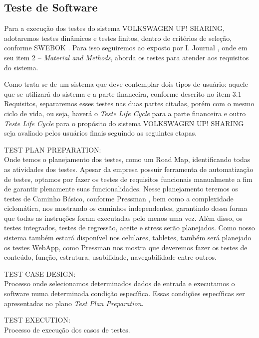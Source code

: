 \documentclass[12pt]{article}
\begin{document}
\subsection{Teste de Software}

Para a execução dos testes  do sistema VOLKSWAGEN UP! SHARING, adotaremos testes dinâmicos  e testes finitos, dentro de critérios de seleção, conforme SWEBOK \cite{Swebok}. Para isso seguiremos ao exposto por I. Journal \cite{Journal2013}, onde em seu item 2 – \textit{Material and Methods}, aborda os testes para atender aos requisitos do sistema.

Como trata-se de um sistema que deve contemplar dois tipos de usuário: aquele que se utilizará do sistema e a parte financeira, conforme descrito no item 3.1 Requisitos, separaremos esses testes nas duas partes citadas, porém com o mesmo ciclo de vida, ou seja, haverá o \textit{Teste Life Cycle} para a parte financeira e outro \textit{Teste Life Cycle} para o propósito do sistema VOLKSWAGEN UP! SHARING seja avaliado pelos usuários finais seguindo as seguintes etapas.


TEST PLAN PREPARATION: \\
Onde temos o planejamento dos testes, como um Road Map, identificando todas as atividades dos testes. Apesar da empresa possuir ferramenta de automatização de testes, optamos por fazer os testes de requisitos funcionais manualmente a fim de garantir plenamente suas funcionalidades. \newline
Nesse planejamento teremos os testes de Caminho Básico, conforme Pressman \cite{Pressman}, bem como a complexidade ciclomática, nos mostrando os caminhos independentes, garantindo dessa forma que todas as instruções foram executadas pelo menos uma vez. 
Além disso, os testes integrados, testes de regressão, aceite e stress serão planejados. \newline
Como nosso sistema também estará disponível nos celulares, tabletes, também será planejado os testes WebApp, como Pressman \cite{Pressman} nos mostra que deveremos fazer os testes de conteúdo, função, estrutura, usabilidade, navegabilidade entre outros.

TEST CASE DESIGN: \\
Processo onde selecionamos determinados dados de entrada e executamos o software numa determinada condição específica. Essas condições específicas ser apresentadas no plano \textit{Test Plan Preparation}.

TEST EXECUTION: \\
Processo de execução dos casos de testes.
\end{document}
